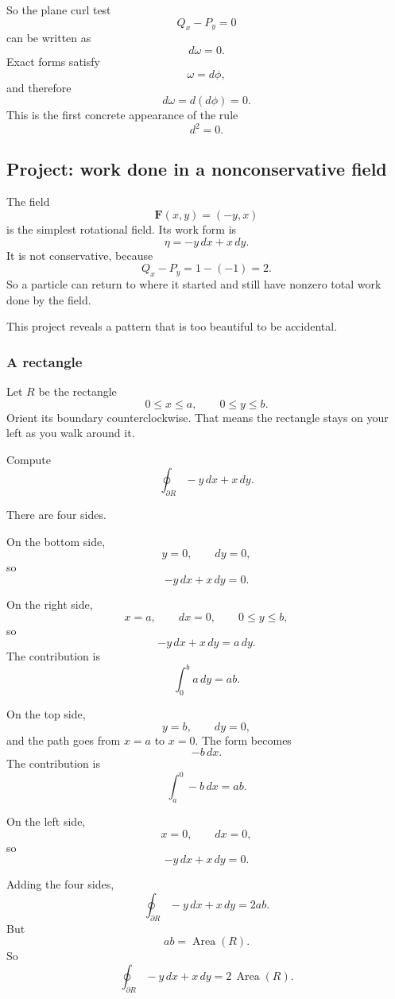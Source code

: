 So the plane curl test
\[
    Q_x-P_y=0
\]
can be written as
\[
    d\omega=0.
\]
Exact forms satisfy
\[
    \omega=d\phi,
\]
and therefore
\[
    d\omega=d(d\phi)=0.
\]
This is the first concrete appearance of the rule
\[
\boxed{
    d^2=0.
}
\]

\subsection{Project: work done in a nonconservative field}

The field
\[
    \mathbf F(x,y)=(-y,x)
\]
is the simplest rotational field.  Its work form is
\[
    \eta=-y\,dx+x\,dy.
\]
It is not conservative, because
\[
    Q_x-P_y=1-(-1)=2.
\]
So a particle can return to where it started and still have nonzero total work done by
the field.

This project reveals a pattern that is too beautiful to be accidental.

\subsubsection*{A rectangle}

Let \(R\) be the rectangle
\[
    0\le x\le a,
    \qquad
    0\le y\le b.
\]
Orient its boundary counterclockwise.  That means the rectangle stays on your left as
you walk around it.

Compute
\[
    \oint_{\partial R} -y\,dx+x\,dy.
\]

There are four sides.

On the bottom side,
\[
    y=0,\qquad dy=0,
\]
so
\[
    -y\,dx+x\,dy=0.
\]

On the right side,
\[
    x=a,\qquad dx=0,\qquad 0\le y\le b,
\]
so
\[
    -y\,dx+x\,dy=a\,dy.
\]
The contribution is
\[
    \int_0^b a\,dy=ab.
\]

On the top side,
\[
    y=b,\qquad dy=0,
\]
and the path goes from \(x=a\) to \(x=0\).  The form becomes
\[
    -b\,dx.
\]
The contribution is
\[
    \int_a^0 -b\,dx=ab.
\]

On the left side,
\[
    x=0,\qquad dx=0,
\]
so
\[
    -y\,dx+x\,dy=0.
\]

Adding the four sides,
\[
\boxed{
    \oint_{\partial R} -y\,dx+x\,dy=2ab.
}
\]
But
\[
    ab=\operatorname{Area}(R).
\]
So
\[
\boxed{
    \oint_{\partial R} -y\,dx+x\,dy
    =
    2\,\operatorname{Area}(R).
}
\]

